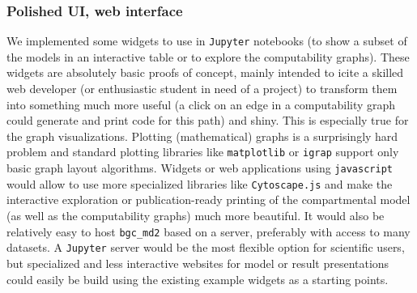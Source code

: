 \subsubsection{Polished UI, web interface}
We implemented some widgets to use in \texttt{Jupyter} notebooks (\eg to show a subset
of the models in an interactive table or to explore the computability graphs).
These widgets are absolutely basic  proofs of concept, mainly intended to icite a skilled web developer 
(or enthusiastic student in need of a project) to transform them into something much
more useful (a click on an edge in a computability graph could generate and print code for this path) and shiny.
This is especially true for the graph visualizations. 
Plotting (mathematical) graphs is a surprisingly hard problem and
standard plotting libraries like \texttt{matplotlib} or
\texttt{igrap}  support only basic graph layout algorithms.  
Widgets or web applications using \texttt{javascript} would allow to use more specialized libraries like \texttt{Cytoscape.js} 
and make the interactive exploration or publication-ready printing of the compartmental model (as well as the computability graphs) 
much more beautiful. 
It would also be relatively easy to host \texttt{bgc\_md2} based on a server, preferably with access to many datasets.
A \texttt{Jupyter} server would be the most flexible option for scientific users, 
but specialized and less interactive websites for model or result presentations could 
easily be build using the existing example widgets as a starting points. 







